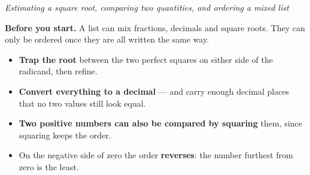 \documentclass[12pt]{article}
\begin{document}

\begin{center}
\textit{Estimating a square root, comparing two quantities, and ordering a
mixed list}
\end{center}

\noindent\textbf{Before you start.} A list can mix fractions, decimals and
square roots. They can only be ordered once they are all written the same way.

\begin{itemize}[leftmargin=1.2cm, itemsep=2pt, topsep=2pt]
\item \textbf{Trap the root} between the two perfect squares on either side of
the radicand, then refine.
\item \textbf{Convert everything to a decimal} --- and carry enough decimal
places that no two values still look equal.
\item \textbf{Two positive numbers can also be compared by squaring} them, since
squaring keeps the order.
\item On the negative side of zero the order \textbf{reverses}: the number
furthest from zero is the least.
\end{itemize}

\medskip





\end{document}
